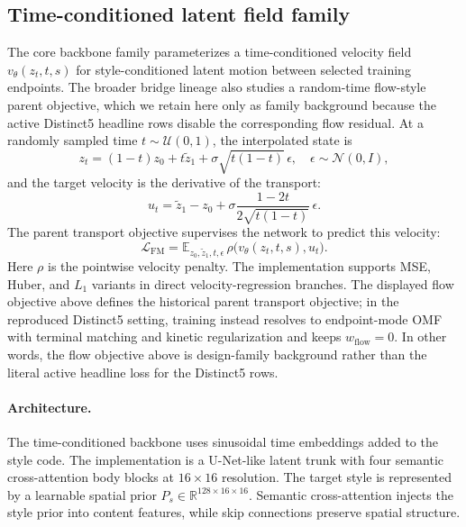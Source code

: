 \documentclass[letterpaper]{article}
\begin{document}
\subsection{Time-conditioned latent field family}
The core backbone family parameterizes a time-conditioned velocity field $v_\theta(z_t,t,s)$ for style-conditioned latent motion between selected training endpoints. The broader bridge lineage also studies a random-time flow-style parent objective, which we retain here only as family background because the active Distinct5 headline rows disable the corresponding flow residual. At a randomly sampled time $t\sim\mathcal{U}(0,1)$, the interpolated state is
\begin{equation}
    z_t = (1-t)z_0 + t\tilde{z}_1 + \sigma\sqrt{t(1-t)}\,\epsilon,
    \quad \epsilon\sim\mathcal{N}(0,I),
\end{equation}
and the target velocity is the derivative of the transport:
\begin{equation}
    u_t = \tilde{z}_1 - z_0 + \sigma\frac{1-2t}{2\sqrt{t(1-t)}}\,\epsilon .
\end{equation}
The parent transport objective supervises the network to predict this velocity:
\begin{equation}
    \mathcal{L}_{\mathrm{FM}} = \mathbb{E}_{z_0,\tilde{z}_1,t,\epsilon}\,
    \rho\!\bigl(v_\theta(z_t,t,s), u_t\bigr) .
\end{equation}
Here $\rho$ is the pointwise velocity penalty. The implementation supports MSE, Huber, and $L_1$ variants in direct velocity-regression branches. The displayed flow objective above defines the historical parent transport objective; in the reproduced Distinct5 setting, training instead resolves to endpoint-mode OMF with terminal matching and kinetic regularization and keeps $w_{\mathrm{flow}}=0$. In other words, the flow objective above is design-family background rather than the literal active headline loss for the Distinct5 rows.

\paragraph{Architecture.}
The time-conditioned backbone uses sinusoidal time embeddings added to the style code. The implementation is a U-Net-like latent trunk with four semantic cross-attention body blocks at $16\times16$ resolution. The target style is represented by a learnable spatial prior $P_s\in\mathbb{R}^{128\times16\times16}$. Semantic cross-attention injects the style prior into content features, while skip connections preserve spatial structure.
\end{document}
